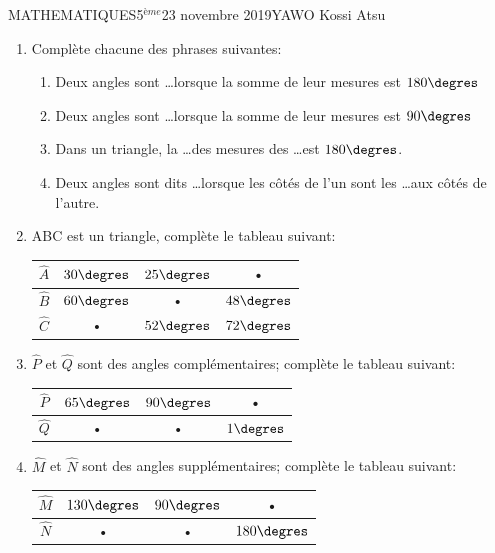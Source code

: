 \documentclass[12pt,a4paper]{book}
\newcommand{\prof}{YAWO Kossi Atsu}
\newcommand{\matiere}{MATHEMATIQUES}
\newcommand{\classe}{5$^{ème}$}
\begin{document}
\begin{td}{\matiere}{\classe}{23 novembre 2019}{\prof}
\begin{exo}
\begin{enumerate}
\item Complète chacune des phrases suivantes:
\begin{enumerate}
\item Deux angles sont \ldots lorsque la somme de leur mesures est $180\degres$
\item Deux angles sont \ldots lorsque la somme de leur mesures est $90\degres$
\item Dans un triangle, la \ldots des mesures des \ldots est $180\degres$.
\item Deux angles sont dits \ldots lorsque les côtés de l'un sont les \ldots aux côtés de l'autre.
\end{enumerate}
\item ABC est un triangle, complète le tableau suivant:\\
\begin{tabular}{|c|c|c|c|}
\hline 
$\widehat{A}$ & $30 \degres$ &  $25 \degres$ & • \\ 
\hline 
$\widehat{B}$ &  $60 \degres$ & • &  $48 \degres$ \\ 
\hline 
$\widehat{C}$ & • &  $52 \degres$ &  $72 \degres$ \\ 
\hline 
\end{tabular} 

\item $\widehat{P}$ et $\widehat{Q}$ sont des angles complémentaires; complète le tableau suivant:\\
\begin{tabular}{|c|c|c|c|}
\hline 
$\widehat{P}$ & $65 \degres$ &  $90 \degres$ & • \\ 
\hline 
$\widehat{Q}$ & • & • &  $1 \degres$ \\ 
\hline 
\end{tabular} 

\item $\widehat{M}$ et $\widehat{N}$ sont des angles supplémentaires; complète le tableau suivant:\\
\begin{tabular}{|c|c|c|c|}
\hline 
$\widehat{M}$ & $130 \degres$ &  $90 \degres$ & • \\ 
\hline 
$\widehat{N}$ & • & • &  $180 \degres$ \\ 
\hline 
\end{tabular} 


\end{enumerate}
\end{exo}
\end{td}
\end{document}
